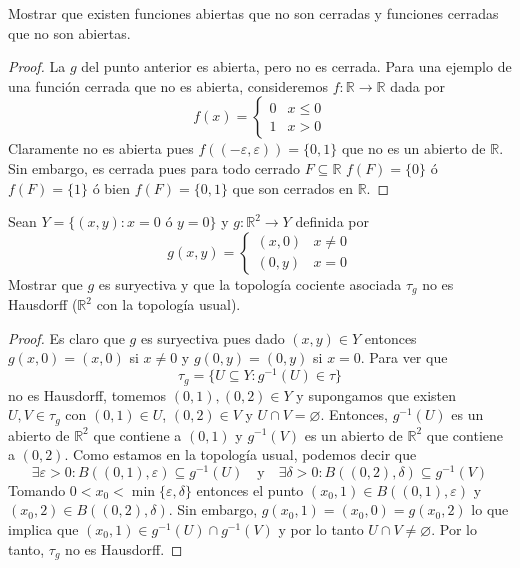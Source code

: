 \documentclass{article}
\theoremstyle{plain}
\theoremstyle{definition}
\newcommand{\R}{\mathbb{R}}
\newenvironment{ejercicio}[1]{\begin{trivlist}
\item[\hskip \labelsep {\bfseries Ejercicio}\hskip \labelsep {\bfseries #1.}]}{\end{trivlist}}
\begin{document}
\begin{ejercicio}{8}
    Mostrar que existen funciones abiertas que no son cerradas y funciones cerradas que no son abiertas.
\end{ejercicio}
\begin{proof}
    La \( g \) del punto anterior es abierta, pero no es cerrada. Para una ejemplo de una función cerrada que no es abierta, consideremos \( f : \R \to \R \) dada por \[
        f(x) = \begin{cases}
            0 & x \leq 0 \\
            1 & x > 0
        \end{cases}
    \]
    Claramente no es abierta pues \( f((-\varepsilon, \varepsilon)) = \{0, 1\} \) que no es un abierto de \( \R \). Sin embargo, es cerrada pues para todo cerrado \( F \subseteq \R \) \( f(F) = \{ 0 \} \) ó \( f(F) = \{ 1 \} \) ó bien \( f(F) = \{ 0, 1 \} \) que son cerrados en \( \R \).
\end{proof}

\begin{ejercicio}{9}
    Sean \( Y = \{(x, y) : x = 0 \text{ ó } y = 0\} \) y \( g : \R^2 \to Y \) definida por
    \[
        g(x, y) = \begin{cases} (x, 0) & x \neq 0 \\ (0, y) & x = 0 \end{cases}
    \]
    Mostrar que \( g \) es suryectiva y que la topología cociente asociada \( \tau_g \) no es Hausdorff (\( \R^2 \) con la topología usual).
\end{ejercicio}
\begin{proof}
    Es claro que \( g \) es suryectiva pues dado \( (x, y) \in Y \) entonces \( g(x, 0) = (x, 0) \) si \( x \neq 0 \) y \( g(0, y) = (0, y) \) si \( x = 0 \).
    Para ver que \[ \tau_g = \{ U \subseteq Y : g^{-1}(U) \in \tau \} \] no es Hausdorff, tomemos \( (0, 1), (0, 2) \in Y \)
    y supongamos que existen \( U, V \in \tau_g \) con \( (0, 1) \in U \), \( (0, 2) \in V \) y \( U \cap V = \varnothing \). Entonces,
    \( g^{-1}(U) \) es un abierto de \( \R^2 \) que contiene a \( (0, 1) \) y \( g^{-1}(V) \) es un abierto de \( \R^2 \) que contiene a \( (0, 2) \). Como estamos en la topología usual,
    podemos decir que \[
        \exists \varepsilon > 0 : B((0, 1), \varepsilon) \subseteq g^{-1}(U) \quad \text{y} \quad \exists \delta > 0 : B((0, 2), \delta) \subseteq g^{-1}(V)
    \]
    Tomando \( 0 < x_0 < \min \{\varepsilon, \delta \} \) entonces el punto \( (x_0, 1) \in B((0, 1), \varepsilon) \) y \( (x_0, 2) \in B((0, 2), \delta) \).
    Sin embargo, \( g(x_0, 1) = (x_0, 0) = g(x_0, 2) \) lo que implica que \( (x_0, 1) \in g^{-1}(U) \cap g^{-1}(V) \) y por lo tanto \( U \cap V \neq \varnothing \). Por lo tanto, \( \tau_g \) no es Hausdorff.

\end{proof}
\end{document}
